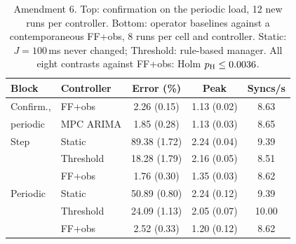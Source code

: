 \begin{table}[t]\centering\footnotesize
\caption{Amendment 6. Top: confirmation on the periodic load, 12 new runs per controller. Bottom: operator baselines against a contemporaneous FF+obs, 8 runs per cell and controller. Static: $J=100$\,ms never changed; Threshold: rule-based manager. All eight contrasts against FF+obs: Holm $p_{\rm H}\le0.0036$.}\label{tab:amend6}
\begin{tabular}{llccc}\toprule
Block & Controller & Error (\%) & Peak & Syncs/s\\\midrule
Confirm., & FF+obs & 2.26 (0.15) & 1.13 (0.02) & 8.63\\
periodic & MPC ARIMA & 1.85 (0.28) & 1.13 (0.03) & 8.65\\\midrule
Step & Static & 89.38 (1.72) & 2.24 (0.04) & 9.39\\
 & Threshold & 18.28 (1.79) & 2.16 (0.05) & 8.51\\
 & FF+obs & 1.76 (0.30) & 1.35 (0.03) & 8.62\\\midrule
Periodic & Static & 50.89 (0.80) & 2.24 (0.12) & 9.39\\
 & Threshold & 24.09 (1.13) & 2.05 (0.07) & 10.00\\
 & FF+obs & 2.52 (0.33) & 1.20 (0.12) & 8.62\\
\bottomrule\end{tabular}\end{table}
